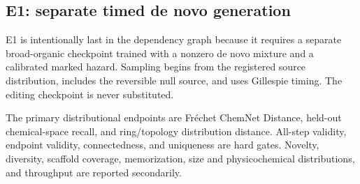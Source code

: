 \subsection{E1: separate timed de novo generation}

E1 is intentionally last in the dependency graph because it requires a
separate broad-organic checkpoint trained with a nonzero de novo mixture and a
calibrated marked hazard. Sampling begins from the registered source
distribution, includes the reversible null source, and uses Gillespie timing.
The editing checkpoint is never substituted.

The primary distributional endpoints are Fr\'echet ChemNet Distance, held-out
chemical-space recall, and ring/topology distribution distance. All-step
validity, endpoint validity, connectedness, and uniqueness are hard gates.
Novelty, diversity, scaffold coverage, memorization, size and physicochemical
distributions, and throughput are reported secondarily.
